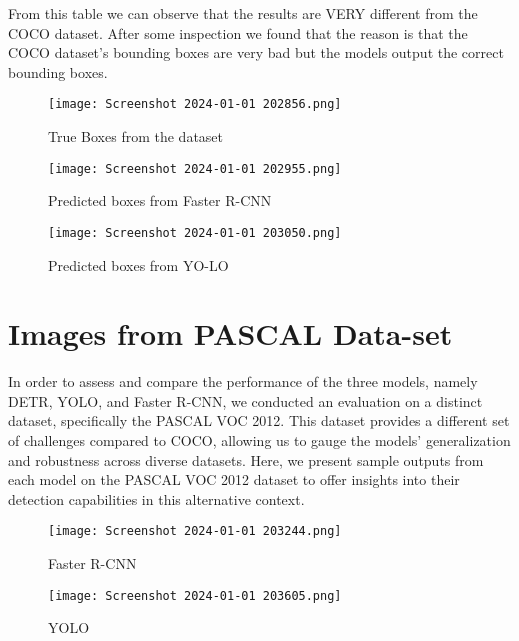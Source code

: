 \documentclass{article}
\begin{document}
From this table we can observe that the results are VERY different from the COCO dataset. After some inspection we found that the reason is that the COCO dataset’s bounding boxes are very bad but the models output the correct bounding boxes.

\begin{figure}[H]
  \centering
  \texttt{[image: Screenshot 2024-01-01 202856.png]} %
  \caption{True Boxes from the dataset}
  \label{fig:example}
\end{figure}

\begin{figure}[H]
  \centering
  \texttt{[image: Screenshot 2024-01-01 202955.png]} %
  \caption{Predicted boxes from Faster R-CNN}
  \label{fig:example}
\end{figure}

\begin{figure}[H]
  \centering
  \texttt{[image: Screenshot 2024-01-01 203050.png]} %
  \caption{Predicted boxes from YO-LO}
  \label{fig:example}
\end{figure}

\section{Images from PASCAL Data-set}

In order to assess and compare the performance of the three models, namely DETR, YOLO, and Faster R-CNN, we conducted an evaluation on a distinct dataset, specifically the PASCAL VOC 2012. This dataset provides a different set of challenges compared to COCO, allowing us to gauge the models' generalization and robustness across diverse datasets. Here, we present sample outputs from each model on the PASCAL VOC 2012 dataset to offer insights into their detection capabilities in this alternative context.

\begin{figure}[H]
  \centering
  \texttt{[image: Screenshot 2024-01-01 203244.png]} %
  \caption{Faster R-CNN}
  \label{fig:example}
\end{figure}

\begin{figure}[H]
  \centering
  \texttt{[image: Screenshot 2024-01-01 203605.png]} %
  \caption{YOLO}
  \label{fig:example}
\end{figure}
\end{document}
